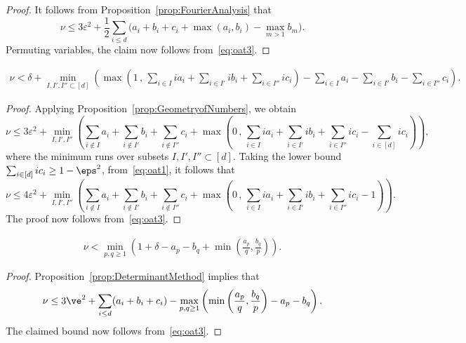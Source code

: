 \begin{proof}
  It follows from Proposition~\ref{prop:FourierAnalysis} that
  \[
  \nu \leq 3\varepsilon^2+
  \frac{1}{2}\sum_{i\leq d}\Big(a_i+b_i+c_i +\max(a_i,b_i) - \max_{m>1}b_m\Big).
  \]
  Permuting variables, the claim now follows from~\eqref{eq:oat3}.
\end{proof}

\begin{proposition}\label{prop:GeometryBound}
  \begin{align*}
  \nu < \delta + \min_{I,I',I''\subset [d]} \left(
  \max\left( 1 \,,\, \sum_{i\in I} ia_i +\sum_{i\in I'} ib_i + \sum_{i\in I''} ic_i\right) - \sum_{i\in I} a_i -\sum_{i\in I'} b_i - \sum_{i\in I''} c_i\right).
  \end{align*}
\end{proposition}
\begin{proof}
  Applying Proposition~\ref{prop:GeometryofNumbers}, we obtain
  \[
  \nu \leq 3\varepsilon^2+
  \min_{I,I',I''}
  \left( \sum_{i\notin I} a_i +\sum_{i\notin I'} b_i + \sum_{i\notin I''} c_i +
  \max\left( 0 \,,\, \sum_{i\in I} ia_i +\sum_{i\in I'} ib_i + \sum_{i\in I''} ic_i-
  \sum_{i\in [d]} ic_i
  \right)\right) ,
  \]
  where the minimum runs over subsets
  $I,I',I''\subset[d]$. Taking the lower bound
  $\sum_{i\in [d]} ic_i\ge 1-\eps^2$,
  from~\eqref{eq:oat1},
  it follows that
  \begin{equation}
  \nu
  \leq 4\varepsilon^2+
  \min_{I,I',I''}
  \left( \sum_{i\notin I} a_i +\sum_{i\notin I'} b_i + \sum_{i\notin I''} c_i+
  \max\left( 0 \,,\, \sum_{i\in I} ia_i +\sum_{i\in I'} ib_i + \sum_{i\in I''} ic_i-1\right)\right).\label{eq:Geoalt}
  \end{equation}
  The proof now follows from~\eqref{eq:oat3}.
\end{proof}

\begin{proposition}\label{prop:DeterminantBound}
  \begin{align*}
    \nu < \min_{p,q\ge1} \left( 1+\delta- a_p - b_q +\min\left(\frac{a_p}{q}, \frac{b_q}{p}\right)\right).
  \end{align*}
\end{proposition}
\begin{proof}
  Proposition~\ref{prop:DeterminantMethod} implies
  that
  \[
  \nu\leq 3\ve^2+
  \sum_{i\leq d} (a_i+b_i+c_i)
  -\max_{p,q\geq 1} \left(\min\left(
  \frac{a_p}{q}, \frac{b_q}{p}\right)
  -a_p-b_q\right).
  \]
  The claimed bound now follows from~\eqref{eq:oat3}.
\end{proof}


